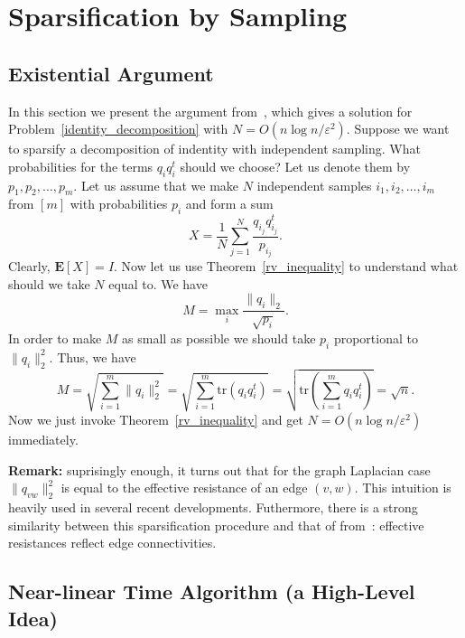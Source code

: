 \documentclass[12pt]{article}
\newcommand{\eps}{\varepsilon}
\begin{document}
    \section{Sparsification by Sampling}
    \label{resistances}

    \subsection{Existential Argument}

    In this section we present the argument from~\cite{SS11}, which gives a solution
    for Problem~\ref{identity_decomposition} with $N = O(n \log n / \eps^2)$.
    Suppose we want to sparsify a decomposition of indentity with independent sampling.
    What probabilities for the terms $q_i q_i^t$ should we choose?
    Let us denote them by $p_1, p_2, \ldots, p_m$.
    Let us assume that we make $N$ independent samples $i_1, i_2, \ldots, i_m$
    from $[m]$ with probabilities $p_i$ and form a sum
    $$
        X = \frac{1}{N} \sum_{j=1}^N \frac{q_{i_j} q_{i_j}^t}{p_{i_j}}.
    $$
    Clearly, $\mathbf{E}[X] = I$. Now let us use Theorem~\ref{rv_inequality} to understand
    what should we take $N$ equal to. We have
    $$
        M = \max_i \frac{\|q_i\|_2}{\sqrt{p_i}}.
    $$
    In order to make $M$ as small as possible we should take $p_i$ proportional to
    $\|q_i\|_2^2$. Thus, we have
    $$
        M = \sqrt{\sum_{i=1}^m \|q_i\|_2^2} =
        \sqrt{\sum_{i=1}^m \mathrm{tr}(q_i q_i^t)} =
        \sqrt{\mathrm{tr}\left(\sum_{i=1}^m q_i q_i^t\right)} = \sqrt{n}.
    $$
    Now we just invoke Theorem~\ref{rv_inequality} and get $N = O(n \log n / \eps^2)$
    immediately.

    \textbf{Remark:} suprisingly enough, it turns out that for the graph Laplacian case
    $\|q_{vw}\|_2^2$ is equal to the effective resistance of an edge $(v, w)$.
    This intuition is heavily used in several recent developments. Futhermore, there is a strong similarity between this
    sparsification procedure and that of from~\cite{BK96}: effective resistances reflect edge connectivities.

    \subsection{Near-linear Time Algorithm (a High-Level Idea)}
\end{document}
